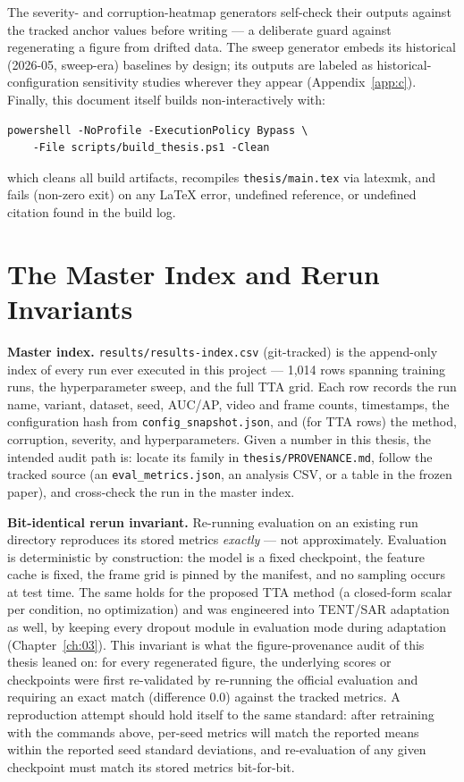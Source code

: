 The severity- and corruption-heatmap generators self-check their outputs
against the tracked anchor values before writing --- a deliberate guard
against regenerating a figure from drifted data. The sweep generator embeds
its historical (2026-05, sweep-era) baselines by design; its outputs are
labeled as historical-configuration sensitivity studies wherever they appear
(Appendix~\ref{app:c}). Finally, this document itself builds
non-interactively with:

\begin{verbatim}
powershell -NoProfile -ExecutionPolicy Bypass \
    -File scripts/build_thesis.ps1 -Clean
\end{verbatim}

which cleans all build artifacts, recompiles \texttt{thesis/main.tex} via
latexmk, and fails (non-zero exit) on any LaTeX error, undefined reference, or
undefined citation found in the build log.

\section{The Master Index and Rerun Invariants}
\label{sec:appe-index}

\textbf{Master index.} \texttt{results/results-index.csv} (git-tracked) is
the append-only index of every run ever executed in this project --- 1{,}014
rows spanning training runs, the hyperparameter sweep, and the full TTA grid.
Each row records the run name, variant, dataset, seed, AUC/AP, video and
frame counts, timestamps, the configuration hash from
\texttt{config\_snapshot.json}, and (for TTA rows) the method, corruption,
severity, and hyperparameters. Given a number in this thesis, the intended
audit path is: locate its family in \texttt{thesis/PROVENANCE.md}, follow the
tracked source (an \texttt{eval\_metrics.json}, an analysis CSV, or a table in
the frozen paper), and cross-check the run in the master index.

\textbf{Bit-identical rerun invariant.} Re-running evaluation on an existing
run directory reproduces its stored metrics \emph{exactly} --- not
approximately. Evaluation is deterministic by construction: the model is a
fixed checkpoint, the feature cache is fixed, the frame grid is pinned by the
manifest, and no sampling occurs at test time. The same holds for the
proposed TTA method (a closed-form scalar per condition, no optimization) and
was engineered into TENT/SAR adaptation as well, by keeping every dropout
module in evaluation mode during adaptation (Chapter~\ref{ch:03}). This
invariant is what the figure-provenance audit of this thesis leaned on: for
every regenerated figure, the underlying scores or checkpoints were first
re-validated by re-running the official evaluation and requiring an exact
match (difference $0.0$) against the tracked metrics. A reproduction attempt
should hold itself to the same standard: after retraining with the commands
above, per-seed metrics will match the reported means within the reported
seed standard deviations, and re-evaluation of any given checkpoint must
match its stored metrics bit-for-bit.

